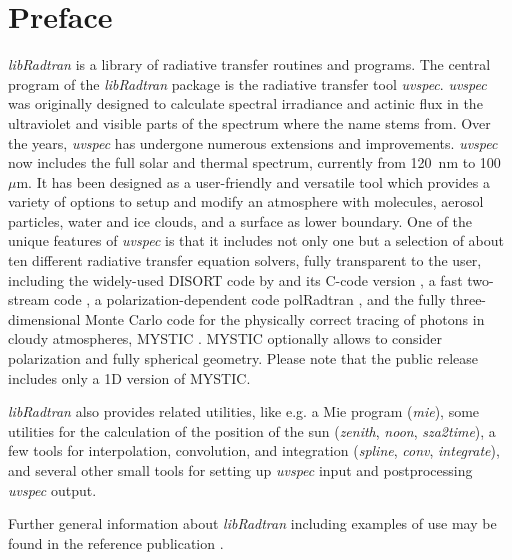 \chapter{Preface}
\label{sec:intro}


{\sl libRadtran} is a library of radiative transfer routines and
programs.  The central program of the {\sl libRadtran} package is the
radiative transfer tool {\sl uvspec}.  {\sl uvspec} was originally
designed to calculate spectral irradiance and actinic flux in the
ultraviolet and visible parts of the spectrum \citep{kylling92a} where
the name stems from. Over the years, {\sl uvspec} has undergone
numerous extensions and improvements. {\sl uvspec} now includes the
full solar and thermal spectrum, currently from 120~nm to
100~$\mu$m. It has been designed as a user-friendly and versatile tool
which provides a variety of options to setup and modify an atmosphere
with molecules, aerosol particles, water and ice clouds, and a surface
as lower boundary. One of the unique features of {\sl uvspec} is that
it includes not only one but a selection of about ten different
radiative transfer equation solvers, fully transparent to the user,
including the widely-used DISORT code by \citet{Stamnes1988c} and its
C-code version \citep{buras2011b}, a fast two-stream code
\citep{Kylling1995}, a polarization-dependent code polRadtran
\citep{Evans1991}, and the fully three-dimensional Monte
Carlo code for the physically correct tracing of photons in cloudy
atmospheres, MYSTIC \citep{mayer2009, emde2007, emde2010, buras2011a,
emde2011}. MYSTIC optionally allows to consider polarization and fully
spherical geometry. Please note that the public release includes only a
1D version of MYSTIC.

{\sl libRadtran} also provides related utilities, like e.g. a Mie program 
({\sl mie}), some utilities for the calculation of the position of the 
sun ({\sl zenith}, {\sl noon}, {\sl sza2time}), a few tools for 
interpolation, convolution, and integration ({\sl spline}, {\sl conv}, 
{\sl integrate}), and several other small tools for setting up
{\sl uvspec} input and postprocessing {\sl uvspec} output. 

Further general information about {\sl libRadtran} including examples
of use may be found in the
reference publication \citep{mayer2005}. 

